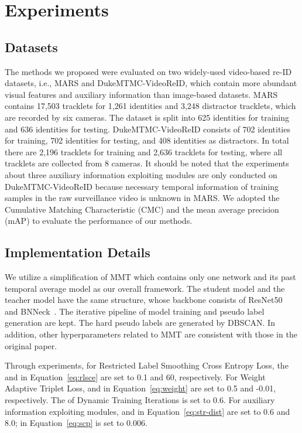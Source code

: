 \documentclass[10pt,twocolumn,letterpaper]{article}
\begin{document}
\section{Experiments}

\subsection{Datasets}

The methods we proposed were evaluated on two widely-used video-based re-ID datasets, i.e., MARS and DukeMTMC-VideoReID, which contain more abundant visual features and auxiliary information than image-based datasets. MARS contains 17,503 tracklets for 1,261 identities and 3,248 distractor tracklets, which are recorded by six cameras. The dataset is split into 625 identities for training and 636 identities for testing. DukeMTMC-VideoReID consists of 702 identities for training, 702 identities for testing, and 408 identities as distractors. In total there are 2,196 tracklets for training and 2,636 tracklets for testing, where all tracklets are collected from 8 cameras. It should be noted that the experiments about three auxiliary information exploiting modules are only conducted on DukeMTMC-VideoReID because necessary temporal information of training samples in the raw surveillance video is unknown in MARS. We adopted the Cumulative Matching Characteristic (CMC) and the mean average precision (mAP) to evaluate the performance of our methods.

\subsection{Implementation Details}

We utilize a simplification of MMT which contains only one network and its past temporal average model as our overall framework. The student model and the teacher model have the same structure, whose backbone consists of ResNet50~\cite{resnet} and BNNeck~\cite{bot}. The iterative pipeline of model training and pseudo label generation are kept. The hard pseudo labels are generated by DBSCAN. In addition, other hyperparameters related to MMT are consistent with those in the original paper.

Through experiments, for Restricted Label Smoothing Cross Entropy Loss, the  and  in Equation~\ref{eq:rlsce} are set to 0.1 and 60, respectively. For Weight Adaptive Triplet Loss,  and  in Equation~\ref{eq:weight} are set to 0.5 and -0.01, respectively. The  of Dynamic Training Iterations is set to 0.6. For auxiliary information exploiting modules,  and  in Equation~\ref{eq:str-dist} are set to 0.6 and 8.0;  in Equation~\ref{eq:scp} is set to 0.006.
\end{document}
